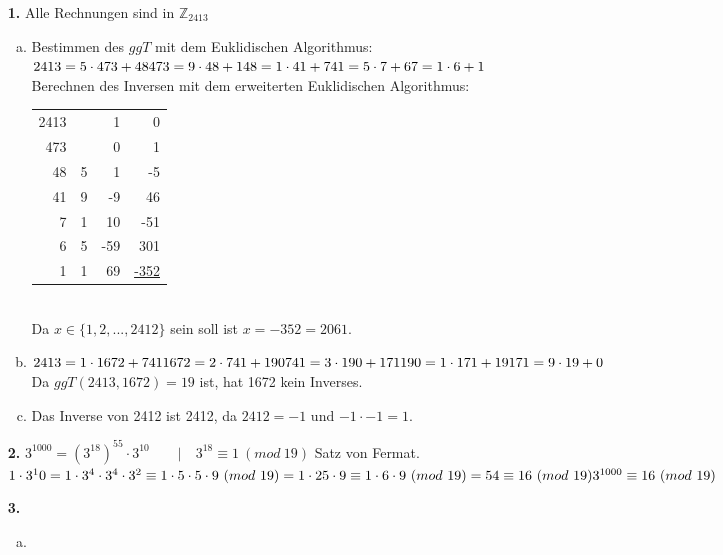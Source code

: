 \documentclass[a4paper]{scrartcl}
\title{\titleinfo}
\author{Elena Noll, Sven-Hendrik Haase, Arne Feil}
\date{\today}
\begin{document}
\maketitle

\begin{enumerate}
\item[\textbf{1.}]
Alle Rechnungen sind in $\mathbb{Z}_{2413}$
\begin{enumerate}[a)]
\item
Bestimmen des $ggT$ mit dem Euklidischen Algorithmus:\\
$2413 = 5 \cdot 473 + 48\\
  473 = 9 \cdot 48 + 1\\
   48 = 1 \cdot 41 + 7\\
   41 = 5 \cdot 7 + 6 \\
    7 = 1 \cdot 6 + 1$ \\
Berechnen des Inversen mit dem erweiterten Euklidischen Algorithmus:\\
\begin{tabular}{rrrr}
2413 & & 1 & 0 \\
473 & & 0 & 1 \\
48 & 5 & 1 & -5 \\
41 & 9 & -9 & 46 \\
7 & 1 & 10 & -51 \\
6 & 5 & -59 & 301 \\
1 & 1 & 69 & \underline{\underline{-352}}
\end{tabular} \\
Da $x \in \{1,2,...,2412\}$ sein soll ist $x = -352 = 2061$.
\item
$2413 = 1 \cdot 1672 + 741 \\
 1672 = 2 \cdot 741 + 190 \\
  741 = 3 \cdot 190 + 171 \\
  190 = 1 \cdot 171 + 19 \\
  171 = 9 \cdot 19 + 0$\\
Da $ggT(2413,1672)=19$ ist, hat 1672 kein Inverses.
\item
Das Inverse von 2412 ist 2412, da $2412 = -1$ und $-1 \cdot-1 = 1$.
\end{enumerate}
\item[\textbf{2.}]
$3^{1000} = (3^{18})^{55} \cdot 3^{10} \quad \quad|\quad 3^{18} \equiv 1~(mod~19)$ Satz von Fermat.\\
$1 \cdot 3^10 = 1 \cdot 3^4 \cdot 3^4 \cdot 3^2\\
\equiv 1 \cdot 5 \cdot 5 \cdot 9 ~(mod~19) = 1 \cdot 25 \cdot 9\\
\equiv 1 \cdot 6 \cdot 9 ~(mod~19)= 54\\
\equiv 16~(mod~19)\\
3^{1000}\equiv 16~(mod~19)$
\newpage
\item[\textbf{3.}]
\begin{enumerate}[a)]
\item


\end{enumerate}
\end{enumerate}
\end{document}
